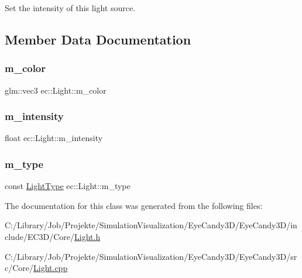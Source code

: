 Set the intensity of this light source. 



\subsection{Member Data Documentation}
\mbox{\label{classec_1_1_light_a7dfc41f1e8f2d7ddad97d60c610c302e}} 
\subsubsection{\texorpdfstring{m\+\_\+color}{m\_color}}
{\footnotesize\ttfamily glm\+::vec3 ec\+::\+Light\+::m\+\_\+color\hspace{0.3cm}{\ttfamily [protected]}}

\mbox{\label{classec_1_1_light_ac655cc4148d5aa4d052bace97770f3b1}} 
\subsubsection{\texorpdfstring{m\+\_\+intensity}{m\_intensity}}
{\footnotesize\ttfamily float ec\+::\+Light\+::m\+\_\+intensity\hspace{0.3cm}{\ttfamily [protected]}}

\mbox{\label{classec_1_1_light_ae3d04075982c6c62e7687b214a504c30}} 
\subsubsection{\texorpdfstring{m\+\_\+type}{m\_type}}
{\footnotesize\ttfamily const \mbox{\hyperlink{namespaceec_a30e2a743ebdeb02ac68a6cfa50f629c7}{Light\+Type}} ec\+::\+Light\+::m\+\_\+type\hspace{0.3cm}{\ttfamily [protected]}}



The documentation for this class was generated from the following files\+:\begin{DoxyCompactItemize}
\item 
C\+:/\+Library/\+Job/\+Projekte/\+Simulation\+Visualization/\+Eye\+Candy3\+D/\+Eye\+Candy3\+D/include/\+E\+C3\+D/\+Core/\mbox{\hyperlink{_light_8h}{Light.\+h}}\item 
C\+:/\+Library/\+Job/\+Projekte/\+Simulation\+Visualization/\+Eye\+Candy3\+D/\+Eye\+Candy3\+D/src/\+Core/\mbox{\hyperlink{_light_8cpp}{Light.\+cpp}}\end{DoxyCompactItemize}
